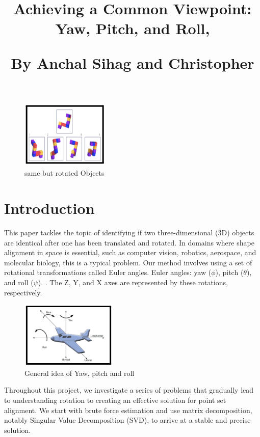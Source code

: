 \documentclass[12pt]{article}
\title{Achieving a Common Viewpoint: Yaw, Pitch, and Roll,


By Anchal Sihag and Christopher}
\author{\vspace{-2ex}}
\date{\vspace{-4ex}}
\begin{document}
\maketitle

\begin{figure}[h]
    \centering
    \includegraphics[width=0.25\linewidth]{image 2.png}
    \caption{same but rotated Objects}
    \label{fig:enter-label}
\end{figure}
\section*{Introduction}
This paper tackles the topic of identifying if two three-dimensional (3D) objects are identical after one has been translated and rotated.  In domains where shape alignment in space is essential, such as computer vision, robotics, aerospace, and molecular biology, this is a typical problem.  Our method involves using a set of rotational transformations called Euler angles. Euler angles: yaw ($\phi$), pitch ($\theta$), and roll ($\psi$). .  The Z, Y, and X axes are represented by these rotations, respectively. 
\begin{figure}[h]
    \centering
    \includegraphics[width=0.25\linewidth]{image 1.png}
    \caption{General idea of Yaw, pitch and roll}
    \label{fig:enter-label}
\end{figure}
Throughout this project, we investigate a series of problems that gradually lead to understanding rotation to creating an effective solution for point set alignment.  We start with brute force estimation and use matrix decomposition, notably Singular Value Decomposition (SVD), to arrive at a stable and precise solution.
\end{document}
